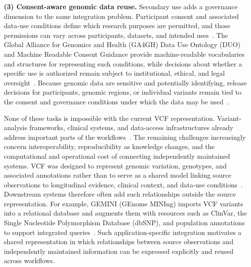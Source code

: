 \documentclass[pdflatex,sn-mathphys-num,referee]{sn-jnl}
\begin{document}
\textbf{(3) Consent-aware genomic data reuse.}\label{uc:reuse}
Secondary use adds a governance dimension to the same integration problem.
Participant consent and associated data-use conditions define which research purposes are permitted, and those permissions can vary across participants, datasets, and intended uses~\cite{lawson2021duo,rehm2021ga4gh}.
The Global Alliance for Genomics and Health (GA4GH) Data Use Ontology (DUO) and Machine Readable Consent Guidance provide machine-readable vocabularies and structures for representing such conditions, while decisions about whether a specific use is authorized remain subject to institutional, ethical, and legal oversight~\cite{lawson2021duo,ga4gh_mrcg,rehm2021ga4gh}.
Because genomic data are sensitive and potentially identifying, release decisions for participants, genomic regions, or individual variants remain tied to the consent and governance conditions under which the data may be used~\cite{gdpr2016,shabani2018gdpr}.

None of these tasks is impossible with the current VCF representation.
Variant-analysis frameworks, clinical systems, and data-access infrastructures already address important parts of the workflows~\cite{paila2013gemini,wake2022pgx,rehm2021ga4gh}.
The remaining challenges increasingly concern interoperability, reproducibility as knowledge changes, and the computational and operational cost of connecting independently maintained systems.
VCF was designed to represent genomic variation, genotypes, and associated annotations rather than to serve as a shared model linking source observations to longitudinal evidence, clinical context, and data-use conditions~\cite{vcf_intro}.
Downstream systems therefore often add such relationships outside the source representation.
For example, GEMINI (GEnome MINIng) imports VCF variants into a relational database and augments them with resources such as ClinVar, the Single Nucleotide Polymorphism Database (dbSNP), and population annotations to support integrated queries~\cite{paila2013gemini}.
Such application-specific integration motivates a shared representation in which relationships between source observations and independently maintained information can be expressed explicitly and reused across workflows.
\end{document}
